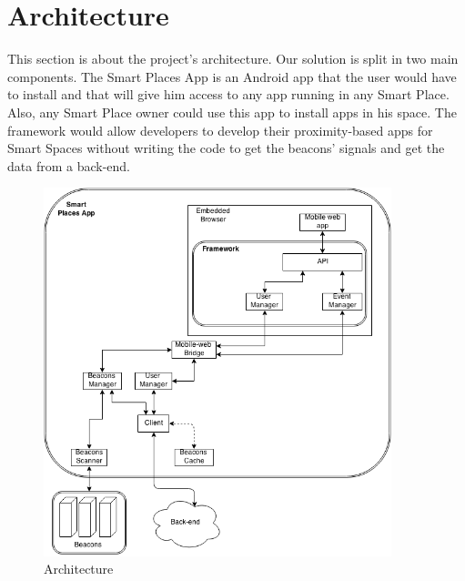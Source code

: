 
% 
% 

\section{Architecture}
\label{sec:architecture}
This section is about the project's architecture.
Our solution is split in two main components.
The Smart Places App is an Android app that the user
would have to install and that will give him access
to any app running in any Smart Place. Also, any
Smart Place owner could use this app to install
apps in his space.
The framework would allow developers to develop their
proximity-based apps for Smart Spaces without writing
the code to get the beacons' signals and get the data
from a back-end. 
\begin{figure}[!ht]
  \caption{Architecture}
  \label{fig:architecture}
  \centering
    \includegraphics[width=0.9\textwidth]{img/architecture}
\end{figure}

